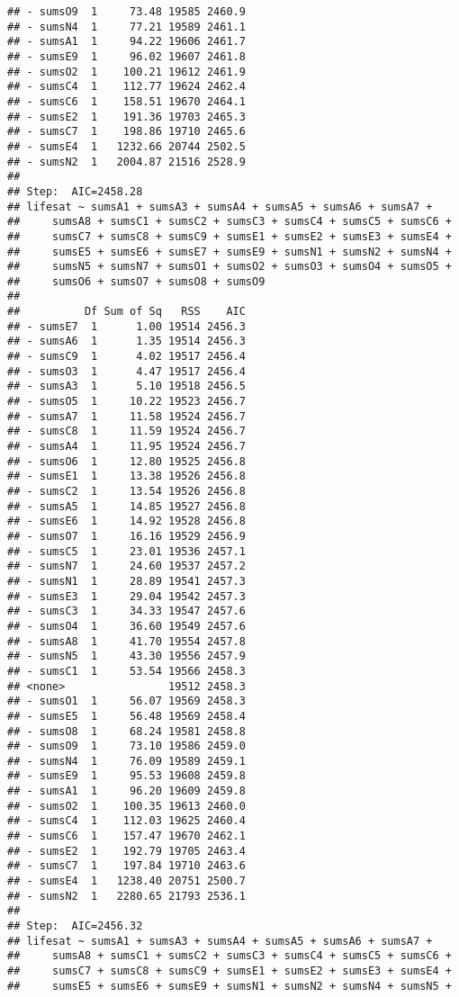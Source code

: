 \documentclass[,man,floatsintext]{apa6}
\begin{document}
\begin{verbatim}
## - sumsO9  1     73.48 19585 2460.9
## - sumsN4  1     77.21 19589 2461.1
## - sumsA1  1     94.22 19606 2461.7
## - sumsE9  1     96.02 19607 2461.8
## - sumsO2  1    100.21 19612 2461.9
## - sumsC4  1    112.77 19624 2462.4
## - sumsC6  1    158.51 19670 2464.1
## - sumsE2  1    191.36 19703 2465.3
## - sumsC7  1    198.86 19710 2465.6
## - sumsE4  1   1232.66 20744 2502.5
## - sumsN2  1   2004.87 21516 2528.9
## 
## Step:  AIC=2458.28
## lifesat ~ sumsA1 + sumsA3 + sumsA4 + sumsA5 + sumsA6 + sumsA7 + 
##     sumsA8 + sumsC1 + sumsC2 + sumsC3 + sumsC4 + sumsC5 + sumsC6 + 
##     sumsC7 + sumsC8 + sumsC9 + sumsE1 + sumsE2 + sumsE3 + sumsE4 + 
##     sumsE5 + sumsE6 + sumsE7 + sumsE9 + sumsN1 + sumsN2 + sumsN4 + 
##     sumsN5 + sumsN7 + sumsO1 + sumsO2 + sumsO3 + sumsO4 + sumsO5 + 
##     sumsO6 + sumsO7 + sumsO8 + sumsO9
## 
##          Df Sum of Sq   RSS    AIC
## - sumsE7  1      1.00 19514 2456.3
## - sumsA6  1      1.35 19514 2456.3
## - sumsC9  1      4.02 19517 2456.4
## - sumsO3  1      4.47 19517 2456.4
## - sumsA3  1      5.10 19518 2456.5
## - sumsO5  1     10.22 19523 2456.7
## - sumsA7  1     11.58 19524 2456.7
## - sumsC8  1     11.59 19524 2456.7
## - sumsA4  1     11.95 19524 2456.7
## - sumsO6  1     12.80 19525 2456.8
## - sumsE1  1     13.38 19526 2456.8
## - sumsC2  1     13.54 19526 2456.8
## - sumsA5  1     14.85 19527 2456.8
## - sumsE6  1     14.92 19528 2456.8
## - sumsO7  1     16.16 19529 2456.9
## - sumsC5  1     23.01 19536 2457.1
## - sumsN7  1     24.60 19537 2457.2
## - sumsN1  1     28.89 19541 2457.3
## - sumsE3  1     29.04 19542 2457.3
## - sumsC3  1     34.33 19547 2457.6
## - sumsO4  1     36.60 19549 2457.6
## - sumsA8  1     41.70 19554 2457.8
## - sumsN5  1     43.30 19556 2457.9
## - sumsC1  1     53.54 19566 2458.3
## <none>                19512 2458.3
## - sumsO1  1     56.07 19569 2458.3
## - sumsE5  1     56.48 19569 2458.4
## - sumsO8  1     68.24 19581 2458.8
## - sumsO9  1     73.10 19586 2459.0
## - sumsN4  1     76.09 19589 2459.1
## - sumsE9  1     95.53 19608 2459.8
## - sumsA1  1     96.20 19609 2459.8
## - sumsO2  1    100.35 19613 2460.0
## - sumsC4  1    112.03 19625 2460.4
## - sumsC6  1    157.47 19670 2462.1
## - sumsE2  1    192.79 19705 2463.4
## - sumsC7  1    197.84 19710 2463.6
## - sumsE4  1   1238.40 20751 2500.7
## - sumsN2  1   2280.65 21793 2536.1
## 
## Step:  AIC=2456.32
## lifesat ~ sumsA1 + sumsA3 + sumsA4 + sumsA5 + sumsA6 + sumsA7 + 
##     sumsA8 + sumsC1 + sumsC2 + sumsC3 + sumsC4 + sumsC5 + sumsC6 + 
##     sumsC7 + sumsC8 + sumsC9 + sumsE1 + sumsE2 + sumsE3 + sumsE4 + 
##     sumsE5 + sumsE6 + sumsE9 + sumsN1 + sumsN2 + sumsN4 + sumsN5 + 

\end{verbatim}
\end{document}
